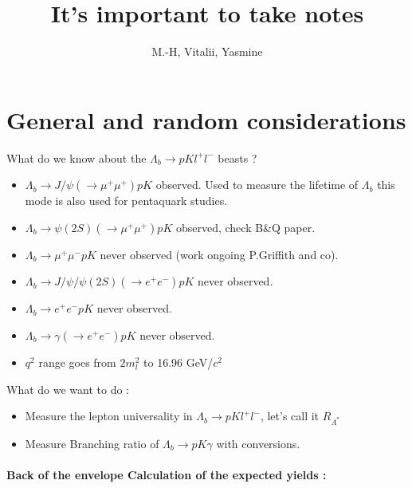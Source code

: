 \documentclass[11pt, oneside]{article}   	%
\title{ It's important to take notes }
\author{M.-H, Vitalii, Yasmine}
\begin{document}
\maketitle

\section {General and random considerations}
What do we know about the  $\Lambda_b\to pK l^+l^-$ beasts  ?

\begin{itemize}
\item $\Lambda_b\to J/\psi (\to\mu^+ \mu^+) pK $ observed. Used to measure the lifetime of $\Lambda_b$ this mode is also used for pentaquark studies.
\item $\Lambda_b\to \psi(2S) (\to \mu^+ \mu^+) pK $ observed, check B\&Q paper.
\item $\Lambda_b\to \mu^+ \mu^- pK $ never observed (work ongoing P.Griffith and co). 
\item $\Lambda_b\to J/\psi/\psi(2S) (\to e ^+e^-) pK $ never observed. 
\item $\Lambda_b\to e ^+e^- pK $ never observed. 
\item $\Lambda_b\to \gamma(\to e ^+e^-) pK $ never observed. 
\item $q^2$ range goes from $2m_l^2$ to 16.96 GeV/$c^{2}$  %
\end{itemize}
What do we want to do : 

\begin{itemize}
\item Measure the lepton universality in $\Lambda_b\to pK l^+l^-$, let's call it $R_{\Lambda^*}$
\item Measure Branching ratio of $\Lambda_b \to p K \gamma $ with conversions. 

\end{itemize}




\paragraph {Back of the envelope Calculation of the expected yields :}
\end{document}
